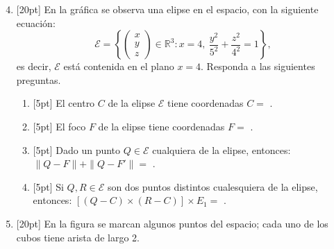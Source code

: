 \documentclass[11pt]{article}
\newcommand{\vectiii}[3]{\begin{pmatrix}#1\\#2\\#3\end{pmatrix}}
\begin{document}
\begin{enumerate}
\setcounter{enumi}{3}
\item{}[20pt] En la gráfica se observa una elipse en el espacio, con la siguiente ecuación:
$$\mathcal{E}=\left\{\vectiii{x}{y}{z}\in\mathbb{R}^3: x=4,\ \frac{y^2}{5^2}+\frac{z^2}{4^2}=1\right\},$$
es decir, $\mathcal{E}$ está contenida en el plano $x=4$. Responda a las siguientes preguntas.

\begin{center}
\end{center}

\begin{enumerate}[label=(\alph*)]
\item{}[5pt] El centro $C$ de la elipse $\mathcal{E}$ tiene coordenadas $C=$ \underline{\hspace{3cm}}.
\item{}[5pt] El foco $F$ de la elipse tiene coordenadas $F=$ \underline{\hspace{3cm}}.
\item{}[5pt] Dado un punto $Q\in\mathcal{E}$ cualquiera de la elipse, entonces: $\|Q-F\|+\|Q-F'\|=$ \underline{\hspace{3cm}}.
\item{}[5pt] Si $Q,R\in\mathcal{E}$ son dos puntos distintos cualesquiera de la elipse, entonces: $[(Q-C)\times(R-C)]\times E_1=$ \underline{\hspace{3cm}}.
\end{enumerate}

\item{}[20pt] En la figura se marcan algunos puntos del espacio; cada uno de los cubos tiene arista de largo 2.


\end{enumerate}
\end{document}
